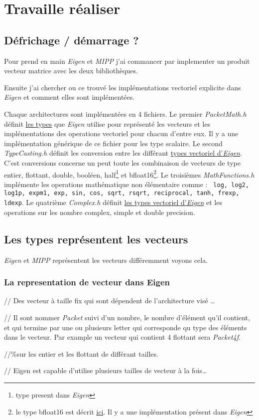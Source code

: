 \section{Travaille réaliser}

\subsection{Défrichage / démarrage ?}

Pour prend en main \emph{Eigen} et \emph{MIPP} j'ai commancer par implementer un produit
vecteur matrice avec les deux bibliothèques.

Ensuite j'ai chercher ou ce trouvé les implémentations vectoriel explicite dans \emph{Eigen}
et comment elles sont implémentées.

Chaque architectures sont implémentées en 4 fichiers. Le premier \emph{PacketMath.h}
définit \hyperref[typeEigen]{les types} que \emph{Eigen} utilise pour représenté les
vecteurs et les implémentations des operations vectoriel pour chacun d'entre eux.
Il y a une implémentation générique de ce fichier pour les type scalaire. Le second
\emph{TypeCasting.h} définit les conversion entre les différant \hyperref[typeEigen]{types
vectoriel d'\emph{Eigen}}. C'est conversions concerne un peut toute les combinaison
de vecteurs de type entier, flottant, double, booléen, half\footnote{type present dans
\emph{Eigen}} et bfloat16\footnote{le type bfloat16 est décrit
\href{https://en.wikipedia.org/wiki/Bfloat16_floating-point_format}{ici}. Il y a une
implémentation présent dans \emph{Eigen}}. Le troisièmes \emph{MathFunctions.h}
implémente les operations mathématique non élémentaire comme : \texttt{ log, log2, log1p,
expm1, exp, sin, cos, sqrt, rsqrt, reciprocal, tanh, frexp, ldexp}. Le quatrième
\emph{Complex.h} définit \hyperref[typeEigen]{les types vectoriel d'\emph{Eigen}} et
les operations sur les nombre complex, simple et double precision.

\subsection{Les types représentent les vecteurs}
\emph{Eigen} et \emph{MIPP} représentent les vecteurs différemment voyons cela.

\label{typeEigen}
\subsubsection{La representation de vecteur dans Eigen}
{ %
  // Des vecteur à taille fix qui sont dépendent de l'architecture visé \dots

  // Il sont nommer \emph{Packet} suivi d'un nombre, le nombre d'élément qu'il contient,
  et qui termine par une ou plusieurs letter qui corresponde qu type des éléments dans
  le vecteur. Par example un vecteur qui contient 4 flottant sera \emph{Packet4f}.

  //\%sur les entier et les flottant de différant tailles.

  // Eigen est capable d'utilise plusieurs tailles de vecteur à la fois\dots
}

